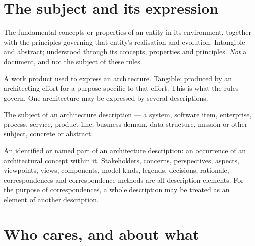 \documentclass[11pt,a4paper]{report}
\begin{document}
\section{The subject and its expression}

\begin{description}[style=nextline,leftmargin=6mm,labelindent=0pt,font=\sffamily\bfseries\color{navy}]
\item[Architecture]
  The fundamental concepts or properties of an entity in its environment,
  together with the principles governing that entity's realisation and
  evolution. Intangible and abstract; understood through its concepts,
  properties and principles. \emph{Not} a document, and not the subject of these
  rules.
\item[Architecture description]
  A work product used to express an architecture. Tangible; produced by an
  architecting effort for a purpose specific to that effort. This is what the
  rules govern. One architecture may be expressed by several descriptions.
\item[Entity of interest]
  The subject of an architecture description --- a system, software item,
  enterprise, process, service, product line, business domain, data structure,
  mission or other subject, concrete or abstract.
\item[Description element]
  An identified or named part of an architecture description: an occurrence of
  an architectural concept within it. Stakeholders, concerns, perspectives,
  aspects, viewpoints, views, components, model kinds, legends, decisions,
  rationale, correspondences and correspondence methods are all description
  elements. For the purpose of correspondences, a whole description may be
  treated as an element of another description.
\end{description}

\section{Who cares, and about what}
\end{document}
